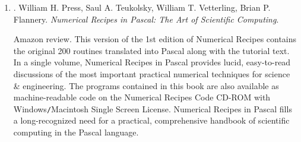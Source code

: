\documentclass{article}
\begin{document}
\begin{enumerate}
	\item \cite{Press_Teukolsky_Vetterling_Flannery_recipe_Fortran90}. {\sc William H. Press, Saul A. Teukolsky, William T. Vetterling, Brian P. Flannery}. {\it Numerical Recipes in Pascal: The Art of Scientific Computing}. {}
	
	{\sf Amazon review.} This version of the 1st edition of Numerical Recipes contains the original 200 routines translated into Pascal along with the tutorial text. In a single volume, Numerical Recipes in Pascal provides lucid, easy-to-read discussions of the most important practical numerical techniques for science \& engineering. The programs contained in this book are also available as machine-readable code on the Numerical Recipes Code CD-ROM with Windows{\tt/}Macintosh Single Screen License. Numerical Recipes in Pascal fills a long-recognized need for a practical, comprehensive handbook of scientific computing in the Pascal language.
	

\end{enumerate}
\end{document}
